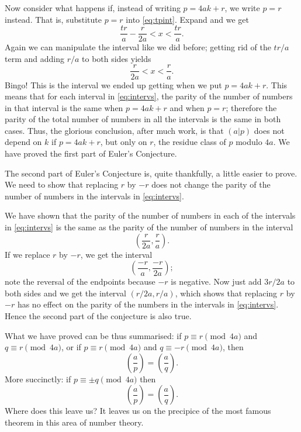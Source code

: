 \documentclass[a4paper]{article}
\newcommand{\leg}[2]{\left(\frac{#1}{#2}\right)}
\newcommand{\ileg}[2]{(#1|#2)}
\begin{document}
Now consider what happens if, instead of
writing \(p=4ak+r\), we write \(p=r\) instead.
That is, substitute \(p=r\) into \eqref{eq:tpint}.
Expand and we get 
\[\frac{tr}{a}-\frac{r}{2a}<x<\frac{tr}{a}.\]
Again we can manipulate the interval like we did
before; getting rid of the \(tr/a\) term and
adding \(r/a\) to both sides yields
\[\frac{r}{2a}<x<\frac{r}{a}.\]
Bingo! This is the interval we ended up getting
when we put \(p=4ak+r\). This means that
for each interval in \eqref{eq:intervs}, the 
parity of the number of numbers in that interval
is the same when \(p=4ak+r\) and when \(p=r\);
therefore the parity of the total number of numbers
in all the intervals is the same in both cases.
Thus, the glorious conclusion, after much work,
is that \(\ileg{a}{p}\) does not depend on
\(k\) if \(p=4ak+r\), but only on \(r\), the
residue class of \(p\) modulo \(4a\). We have
proved the first part of Euler's Conjecture.

The second part of Euler's Conjecture is, quite
thankfully, a little easier to prove. We need
to show that replacing \(r\) by \(-r\) does
not change the parity of the number of numbers
in the intervals in \eqref{eq:intervs}.

We have shown that the parity of the number of
numbers in each of the intervals in \eqref{eq:intervs}
is the same as the parity of the number of 
numbers in the interval \[\left(\frac{r}{2a},\frac{r}{a}\right).\]
If we replace \(r\) by \(-r\), we get the interval
\[\left(\frac{-r}{a},\frac{-r}{2a}\right);\]
note the reversal of the endpoints because \(-r\)
is negative.
Now just add \(3r/2a\) to both sides and we get
the interval \((r/2a,r/a)\), which shows that
replacing \(r\) by \(-r\) has no effect on the parity
of the numbers in the intervals in \eqref{eq:intervs}.
Hence the second part of the conjecture is also true.

What we have proved can be thus summarised: if
\(p\equiv r\pmod{4a}\) and \(q\equiv r\pmod{4a}\),
or if \(p\equiv r\pmod{4a}\) and \(q\equiv-r\pmod{4a}\), 
then \[\leg{a}{p}=\leg{a}{q}.\] 
More succinctly:
if \(p\equiv\pm q\pmod{4a}\) then \[\leg{a}{p}=\leg{a}{q}.\]
Where does this leave us? It leaves us on the precipice
of the most famous theorem in this area of number 
theory.
\end{document}
